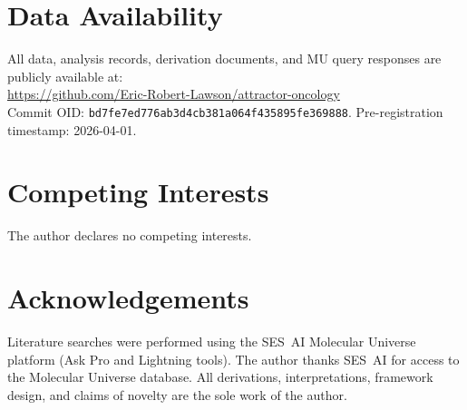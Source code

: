 \documentclass[12pt,letterpaper]{article}
\begin{document}
\section*{Data Availability}

All data, analysis records, derivation documents, and MU
query responses are publicly available at:\\
\url{https://github.com/Eric-Robert-Lawson/attractor-oncology}\\
Commit OID: \texttt{bd7fe7ed776ab3d4cb381a064f435895fe369888}.
Pre-registration timestamp: 2026-04-01.

\section*{Competing Interests}

The author declares no competing interests.

\section*{Acknowledgements}

Literature searches were performed using the SES~AI
Molecular Universe platform (Ask Pro and Lightning tools).
The author thanks SES~AI for access to the Molecular
Universe database.
All derivations, interpretations, framework design, and
claims of novelty are the sole work of the author.
\end{document}
